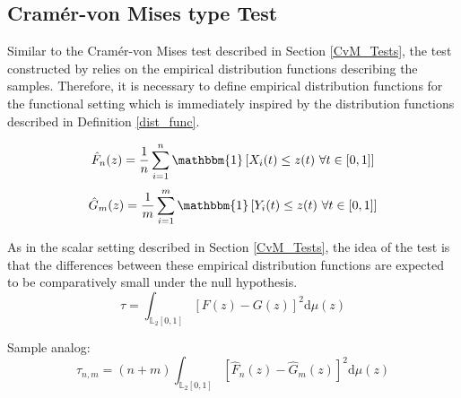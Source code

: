 \documentclass[12pt, a4paper]{article}
\theoremstyle{MAstyle} \newtheorem{assumption}{Assumption}[section]
\theoremstyle{MAstyle} \newtheorem{definition}{Definition}[section]
\theoremstyle{MAstyle} \newtheorem{theorem}{Theorem}[section]
\begin{document}
		\subsection{Cram\'{e}r-von Mises type Test}
			Similar to the Cram\'{e}r-von Mises test described in Section \ref{CvM_Tests}, the test constructed by \cite{bugni_permutation_2021} relies on the empirical distribution functions describing the samples. 
			Therefore, it is necessary to define empirical distribution functions for the functional setting which is immediately inspired by the distribution functions described in Definition \ref{dist_func}.
			\begin{multicols}{2}
				\noindent
				\begin{equation*}
					\hat{F}_n(z) = \frac{1}{n} \sum_{i = 1}^{n}\mathbbm{1}\left[X_i(t) \leq z(t) \ \forall t \in [0,1]\right]
				\end{equation*}
				\begin{equation}
					\hat{G}_m(z) = \frac{1}{m} \sum_{i = 1}^{m}\mathbbm{1}\left[Y_i(t) \leq z(t) \ \forall t \in [0,1]\right]
				\end{equation}
			\end{multicols}
			
			As in the scalar setting described in Section \ref{CvM_Tests}, the idea of the test is that the differences between these empirical distribution functions are expected to be comparatively small under the null hypothesis. 
			\begin{equation}
				\tau = \int_{\mathbb{L}_2[0,1]}\left[F(z) - G(z)\right]^2 \mathrm{d} \mu(z)
			\end{equation}
			
			Sample analog:
			\begin{equation}
				\tau_{n,m} = (n+m) \int_{\mathbb{L}_2[0,1]}\left[\hat{F}_n(z) - \hat{G}_m(z)\right]^2 \mathrm{d} \mu(z)
			\end{equation}
		
\end{document}
